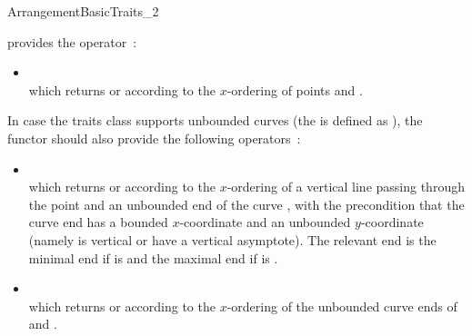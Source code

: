 \begin{ccRefConcept}{ArrangementBasicTraits_2}






\ccThreeToTwo

{provides the operator~:
 \begin{itemize}
 \item {} \\
 which returns  or  according to the
 $x$-ordering of points  and .
 \end{itemize}
 In case the traits class supports unbounded curves (the
  is defined as ), the functor
 should also provide the following operators~:
 \begin{itemize}
 \item {} \\
 which returns  or  according to the
 $x$-ordering of a vertical line passing through the point  and an
 unbounded end of the curve , with the precondition that the curve end
 has a bounded $x$-coordinate and an unbounded $y$-coordinate (namely 
 is vertical or have a vertical asymptote). The relevant end is the minimal
 end if  is  and the maximal end if  is
 .
 \item {} \\
 which returns  or  according to the
 $x$-ordering of the unbounded curve ends of  and .
 \end{itemize}}


\end{ccRefConcept}
